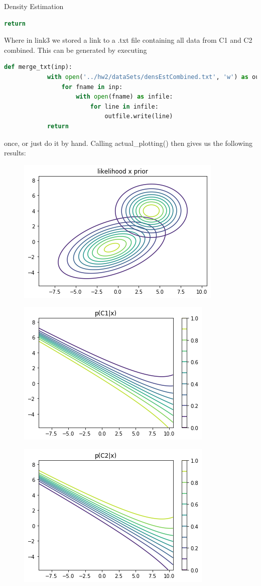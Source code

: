 \documentclass[
ngerman,
]{tudaexercise}
\begin{document}
\begin{task}{Density Estimation}
\begin{subtask}
\begin{lstlisting}[language=Python]
			return
	\end{lstlisting}
	Where in link3 we stored a link to a .txt file containing all data from C1 and C2 combined. This can be generated by executing
	\begin{lstlisting}[language=Python]
		def merge_txt(inp):
			with open('../hw2/dataSets/densEstCombined.txt', 'w') as outfile:
				for fname in inp:
					with open(fname) as infile:
						for line in infile:
							outfile.write(line)
			return
	\end{lstlisting}
	once, or just do it by hand. Calling actual\_plotting() then gives us the following results:
	\begin{figure}[H]
		\includegraphics{likexprior.png}
	\end{figure}
\begin{figure}[H]
		\includegraphics{pc1x.png}
\end{figure}
\begin{figure}[H]
	\includegraphics{pc2x.png}

\end{figure}
\end{subtask}
\end{task}
\end{document}
